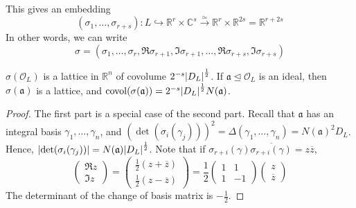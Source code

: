 This gives an embedding
\[ (\sigma_1, \dots, \sigma_{r+s}) \colon L \hookrightarrow \mathbb R^r \times \mathbb C^s \xrightarrow{\simeq} \mathbb R^r \times \mathbb R^{2s} = \mathbb R^{r+2s} \]
In other words, we can write
\[ \sigma = (\sigma_1, \dots, \sigma_r, \Re \sigma_{r+1}, \Im \sigma_{r+1}, \dots, \Re\sigma_{r+s}, \Im\sigma_{r+s}) \]
\begin{lemma}
    \( \sigma(\mathcal O_L) \) is a lattice in \( \mathbb R^n \) of covolume \( 2^{-s} \abs{D_L}^{\frac{1}{2}} \).
    If \( \mathfrak a \trianglelefteq \mathcal O_L \) is an ideal, then \( \sigma(\mathfrak a) \) is a lattice, and \( \operatorname{covol}(\sigma(\mathfrak a)) = 2^{-s} \abs{D_L}^{\frac{1}{2}} N(\mathfrak a) \).
\end{lemma}
\begin{proof}
    The first part is a special case of the second part.
    Recall that \( \mathfrak a \) has an integral basis \( \gamma_1, \dots, \gamma_n \), and \( (\det (\sigma_i(\gamma_j)))^2 = \Delta(\gamma_1, \dots, \gamma_n) = N(\mathfrak a)^2 D_L \).
    Hence, \( \abs{\det(\sigma_i(\gamma_j))} = N(\mathfrak a) \abs{D_L}^{\frac{1}{2}} \).
    Note that if \( \sigma_{r+i}(\gamma) \overline{\sigma_{r+i}(\gamma)} = z\overline z \),
    \[ \begin{pmatrix}
        \Re z \\
        \Im z
    \end{pmatrix} = \begin{pmatrix}
        \frac{1}{2}(z + \overline z) \\
        \frac{1}{2}(z - \overline z)
    \end{pmatrix} = \frac{1}{2}\begin{pmatrix}
        1 & 1 \\
        1 & -1
    \end{pmatrix} \begin{pmatrix}
        z \\ \overline z
    \end{pmatrix} \]
    The determinant of the change of basis matrix is \( -\frac{1}{2} \).
\end{proof}

